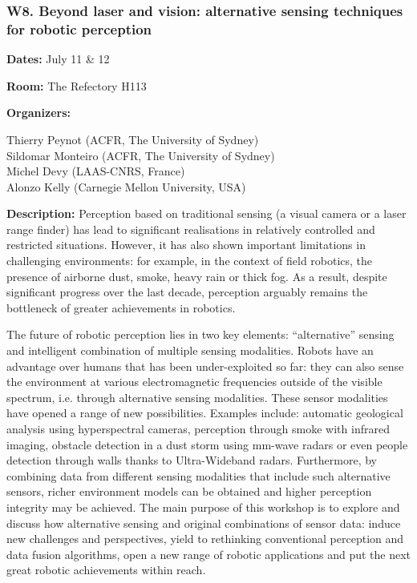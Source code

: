 \subsubsection*{ W8.   Beyond laser and vision: alternative sensing techniques for robotic perception}

{\bf Dates:} July 11 \& 12

{\bf Room:} The Refectory H113

\bigskip
{\bf Organizers:}

Thierry Peynot (ACFR, The University of Sydney)\\
Sildomar Monteiro (ACFR, The University of Sydney)\\
Michel Devy (LAAS-CNRS, France)\\
Alonzo Kelly (Carnegie Mellon University, USA)

\bigskip
{\bf Description:}
Perception based on traditional sensing (a visual camera or a laser range finder) has lead to significant realisations in relatively controlled and restricted situations. However, it has also shown important limitations in challenging environments: for example, in the context of field robotics, the presence of airborne dust, smoke, heavy rain or thick fog. As a result, despite significant progress over the last decade, perception arguably remains the bottleneck of greater achievements in robotics.

The future of robotic perception lies in two key elements: “alternative” sensing and intelligent combination of multiple sensing modalities. Robots have an advantage over humans that has been under-exploited so far: they can also sense the environment at various electromagnetic frequencies outside of the visible spectrum, i.e. through alternative sensing modalities. These sensor modalities have opened a range of new possibilities. Examples include: automatic geological analysis using hyperspectral cameras, perception through smoke with infrared imaging, obstacle detection in a dust storm using mm-wave radars or even people detection through walls thanks to Ultra-Wideband radars. Furthermore, by combining data from different sensing modalities that include such alternative sensors, richer environment models can be obtained and higher perception integrity may be achieved.
The main purpose of this workshop is to explore and discuss how alternative sensing and original combinations of sensor data: induce new challenges and perspectives, yield to rethinking conventional perception and data fusion algorithms, open a new range of robotic applications and put the next great robotic achievements within reach.


